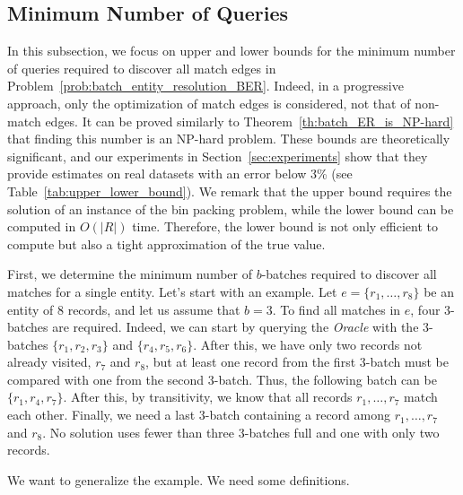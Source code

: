 \documentclass[sigconf, nonacm]{acmart}
\newcommand{\oracle}{\textit{Oracle}\xspace}
\begin{document}
\subsection{Minimum Number of Queries}\label{sub:bounds_minimum_number_of_queries}

In this subsection, we focus on upper and lower bounds for the minimum number of queries required to discover all match edges in Problem~\ref{prob:batch_entity_resolution_BER}. 
Indeed, in a progressive approach, only the optimization of match edges is considered, not that of non-match edges.
It can be proved similarly to Theorem~\ref{th:batch_ER_is_NP-hard} that finding this number is an NP-hard problem. 
These bounds are theoretically significant, and our experiments in Section~\ref{sec:experiments} show that they provide estimates on real datasets with an error below 3\% (see Table~\ref{tab:upper_lower_bound}). 
We remark that the upper bound requires the solution of an instance of the bin packing problem, while the lower bound can be computed in $O(|R|)$ time. 
Therefore, the lower bound is not only efficient to compute but also a tight approximation of the true value.


First, we determine the minimum number of $b$-batches required to discover all matches for a single entity. Let's start with an example. Let $e = \{r_1,\ldots, r_8\}$ be an entity of 8 records, and let us assume that $b = 3$. To find all matches in $e$, four $3$-batches are required.
Indeed, we can start by querying the \oracle with the $3$-batches $\{r_1,r_2,r_3\}$ and $\{r_4,r_5,r_6\}$. After this, we have only two records not already visited, $r_7$ and $r_8$, 
but at least one record from the first $3$-batch must be compared with one from the second $3$-batch. Thus, the following batch can be $\{r_1,r_4,r_7\}$. After this, by transitivity, we know that all records $r_1,\ldots,r_7$ match each other. Finally, we need a last $3$-batch containing a record among $r_1,\ldots,r_7$ and $r_8$. No solution uses fewer than three $3$-batches full and one with only two records.

We want to generalize the example. We need some definitions.
\end{document}
